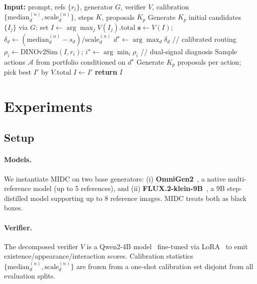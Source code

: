 \documentclass[letterpaper]{article}
\begin{document}
\begin{algorithm}[ht]
\caption{MIDC inference (one task)}
\begin{algorithmic}[1]
\STATE \textbf{Input:} prompt, refs $\{r_i\}$, generator $G$, verifier $V$, calibration $\{\mathrm{median}_d^{(n)}, \mathrm{scale}_d^{(n)}\}$, steps $K$, proposals $K_p$
\STATE Generate $K_p$ initial candidates $\{I_j\}$ via $G$; set $I \leftarrow \arg\max_j V(I_j).\text{total}$
  \STATE $\mathbf{s} \leftarrow V(I)$; $\delta_d \leftarrow (\mathrm{median}_d^{(n)} - s_d)/\mathrm{scale}_d^{(n)}$
  \STATE $d^\star \leftarrow \arg\max_d \delta_d$ \hfill // calibrated routing
  \STATE $\rho_i \leftarrow \mathrm{DINOv2Sim}(I, r_i)$; $i^\star \leftarrow \arg\min_i \rho_i$ \hfill // dual-signal diagnosis
  \STATE Sample actions $\mathcal{A}$ from portfolio conditioned on $d^\star$
  \STATE Generate $K_p$ proposals per action; pick best $I'$ by $V.\text{total}$
    \STATE $I \leftarrow I'$
  \ENDIF
\ENDFOR
\STATE \textbf{return} $I$
\end{algorithmic}
\end{algorithm}

\section{Experiments}

\subsection{Setup}

\paragraph{Models.} We instantiate MIDC on two base generators: (i) \textbf{OmniGen2}~\citep{wu2025omnigen2}, a native multi-reference model (up to 5 references), and (ii) \textbf{FLUX.2-klein-9B}~\citep{blackforest2025flux2}, a 9B step-distilled model supporting up to 8 reference images. MIDC treats both as black boxes.

\paragraph{Verifier.} The decomposed verifier $V$ is a Qwen2-4B model~\citep{yang2024qwen2} fine-tuned via LoRA~\citep{hu2021lora,unsloth2024} to emit existence/appearance/interaction scores. Calibration statistics $\{\mathrm{median}_d^{(n)}, \mathrm{scale}_d^{(n)}\}$ are frozen from a one-shot calibration set disjoint from all evaluation splits.
\end{document}
